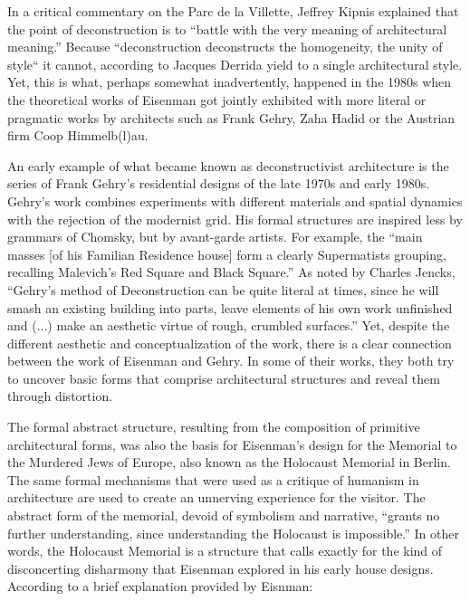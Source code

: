In a critical commentary on the Parc de la Villette, Jeffrey Kipnis explained that
the point of deconstruction is to ``battle with the very meaning of architectural
meaning.'' Because ``deconstruction deconstructs the
homogeneity, the unity of style`` it cannot, according to Jacques Derrida yield to
a single architectural style. Yet, this is what, perhaps somewhat inadvertently, happened
in the 1980s when the theoretical works of Eisenman got jointly exhibited with more literal
or pragmatic works by architects such as Frank Gehry, Zaha Hadid or the Austrian firm Coop
Himmelb(l)au.

An early example of what became known as deconstructivist architecture is the series of Frank
Gehry's residential designs of the late 1970s and early 1980s. Gehry's work combines
experiments with different materials and spatial dynamics with the rejection of the modernist
grid.
His formal structures are inspired less by grammars of Chomsky, but by avant-garde artists.
For example, the ``main masses [of his Familian Residence house] form a clearly Supermatists
grouping, recalling Malevich's Red Square and Black Square.''
As noted by Charles Jencks, ``Gehry’s method of Deconstruction can be quite literal at
times, since he will smash an existing building into parts, leave elements of his own work
unfinished and (...) make an aesthetic virtue of rough, crumbled surfaces.''
Yet, despite the different aesthetic and conceptualization
of the work, there is a clear connection between the work of Eisenman and Gehry. In some of their
works, they both try to uncover basic forms that comprise architectural structures and reveal them
through distortion.

The formal abstract structure, resulting from the composition of primitive architectural forms,
was also the basis for Eisenman's design for the Memorial to the Murdered Jews of Europe,
also known as the Holocaust Memorial in Berlin. The same formal mechanisms that were used as
a critique of humanism in architecture are used to create an unnerving experience for the
visitor.
The abstract form of the memorial, devoid of symbolism and narrative, ``grants no further
understanding, since understanding the Holocaust is impossible.''
In other words, the Holocaust Memorial is a structure that calls exactly for the kind of
disconcerting disharmony that Eisenman explored in his early house designs. According to
a brief explanation provided by Eisnman:

